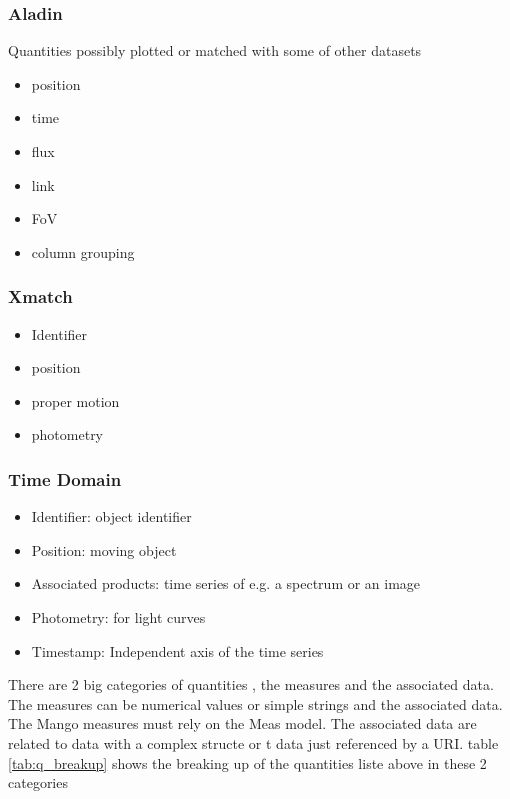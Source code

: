 \documentclass[11pt,a4paper]{ivoa}
\begin{document}
\subsubsection{Aladin}

Quantities possibly plotted or matched with some of other datasets
\begin{itemize}
    \item position
    \item time
    \item flux
    \item link
    \item FoV
    \item column grouping
\end{itemize}

\subsubsection{X\-match}
\begin{itemize}
    \item Identifier
    \item position
    \item proper motion
    \item photometry
\end{itemize}

\subsubsection{Time Domain}
\begin{itemize}
    \item Identifier: object identifier
    \item Position: moving object
    \item Associated products: time series of e.g. a spectrum or an image
    \item Photometry: for light curves
    \item Timestamp: Independent axis of the time series
\end{itemize}

There are 2 big categories of quantities , the measures and the associated data. The measures
 can be numerical values or simple strings and the associated data. The Mango measures must rely on the Meas model. The associated data are related to data with a complex structe or t data just referenced by a URI. table  \ref{tab:q_breakup} shows the breaking up of the quantities liste above in these 2 categories
\end{document}
